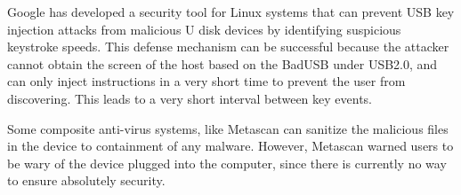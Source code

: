 Google\cite{Googleukip} has developed a security tool for Linux systems that can prevent USB key injection attacks from malicious U disk devices by identifying suspicious keystroke speeds. This defense mechanism can be successful because the attacker cannot obtain the screen of the host based on the BadUSB under USB2.0, and can only inject instructions in a very short time to prevent the user from discovering. This leads to a very short interval between key events.

Some composite anti-virus systems, like Metascan\cite{OPSWAT} can sanitize the malicious files in the device to containment of any malware. However, Metascan warned users to be wary of the device plugged into the computer, since there is currently no way to ensure absolutely security.



